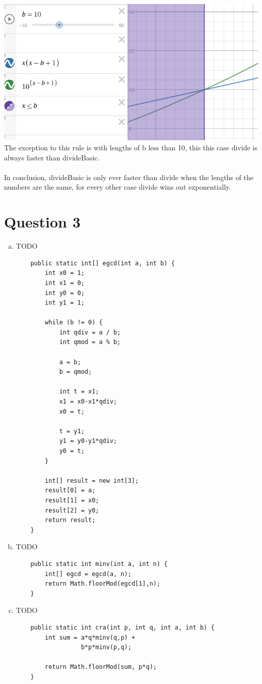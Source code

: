 \documentclass[journal,a4paper]{article}
\begin{document}
\begin{enumerate}[(a)]
	\\\\
	\includegraphics[scale=0.5]{divide-complexity-3} \\
	The exception to this rule is with lengths of b less than 10, this this case divide is always faster than divideBasic.
	\\\\
	In conclusion, divideBasic is only ever faster than divide when the lengths of the numbers are the same, for every other case divide wins out exponentially.	
\end{enumerate}

\section*{Question 3}
\begin{enumerate}[(a)]
	\item TODO \begin{lstlisting}
	public static int[] egcd(int a, int b) {
		int x0 = 1;
		int x1 = 0;
		int y0 = 0;
		int y1 = 1;

		while (b != 0) {
			int qdiv = a / b;
			int qmod = a % b;

			a = b;
			b = qmod;

			int t = x1;
			x1 = x0-x1*qdiv;
			x0 = t;

			t = y1;
			y1 = y0-y1*qdiv;
			y0 = t;
		}

		int[] result = new int[3];
		result[0] = a;
		result[1] = x0;
		result[2] = y0;
		return result;
	}
	\end{lstlisting}

	\item TODO \begin{lstlisting}
	public static int minv(int a, int n) {
		int[] egcd = egcd(a, n);
		return Math.floorMod(egcd[1],n);
	}
	\end{lstlisting}
	
	\item TODO \begin{lstlisting}
	public static int cra(int p, int q, int a, int b) {
		int sum = a*q*minv(q,p) +
		  	      b*p*minv(p,q);

		return Math.floorMod(sum, p*q);
	}
	\end{lstlisting}
\end{enumerate}
\end{document}
